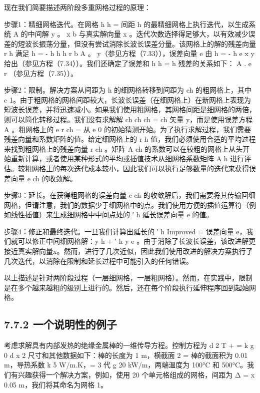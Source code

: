 \documentclass[11pt,a4paper,openany,fontset=none]{ctexbook}
\begin{document}
现在我们简要描述两阶段多重网格过程的原理：

步骤1：精细网格迭代。在网格 h h = 间距 h 的最精细网格上执行迭代，以生成系统 A 的中间解 y 。 x b 与真实解向量 x 。迭代次数选择得足够大，以有效减少误差的短波长振荡分量，但没有尝试消除长波长误差分量。该网格上的解的残差向量 r h 满足 h = - h h h r b A 。 y（参见方程（7.33）），误差向量 e 由 h = - h e x y 给出（参见方程（7.34））。我们还确定了误差和 h h = h 残差的关系如下： A . e r （参见方程（7.35））。

步骤2：限制。解决方案从间距为 h 的细网格转移到间距为 ch 的粗网格上，其中 c 1。由于粗网格的网格间距较大，长波长误差（在细网格上）在新网格上表现为短波长误差，并将迅速减小。如果我们使用粗网格，其网格间距是细网格的两倍，则可以简化转移过程。我们没有求解解 ch ch ch = ch 矢量 y，而是使用误差方程 A 。粗网格上的 e r ch = 从 e 0 的初始猜测开始。为了执行求解过程，我们需要残差向量和系数矩阵的值。给定细网格上的 r h 值，我们必须使用合适的平均过程来找到粗网格上的残差向量 r ch 。矩阵 A ch 的系数可以在较粗的网格上从头开始重新计算，或者使用某种形式的平均或插值技术从细网格系数矩阵 A h 进行评估。较粗网格上的每次迭代成本较小，因此我们可以执行足够数量的迭代来获得误差向量 e ch 的收敛解。

步骤3：延长。在获得粗网格的误差向量 e ch 的收敛解后，我们需要将其传输回细网格，但请注意，我们的数据少于细网格中的点。我们使用方便的插值运算符（例如线性插值）来生成细网格中中间点处的 ′ h 延长误差向量 e 的值。

步骤4：修正和最终迭代。一旦我们计算出延长的 ′ h Improved = 误差向量 e，我们就可以修正中间细网格解：y h + ′ h y e 。由于消除了长波长误差，该改进解更接近真实解向量x。然而，进行了几次近似，因此我们使用改进的解决方案执行了几次迭代，以消除在限制和延长过程中可能引入的任何错误。

以上描述是针对两阶段过程（一层细网格，一层粗网格）。然而，在实践中，限制是在多个越来越粗的级别上进行的。然后，还在每个阶段执行延伸程序回到起始网格。

\subsection*{7.7.2 一个说明性的例子}

考虑求解具有内部发热的绝缘金属棒的一维传导方程。控制方程为
d 2 T + = k g 0 d x 2
尺寸和其他数据如下：棒的长度为 1 m，横截面 2 = 棒的截面积为 0.01 m，导热系数 k 5 W/m.K，= 3 代 g 20 kW/m，两端温度为 100°C 和 500°C。我们有兴趣获得一个解决方案，例如，使用 20 个单元格组成的网格，间距为 Δ = x 0.05 m，我们将其命名为网格 1。
\end{document}
